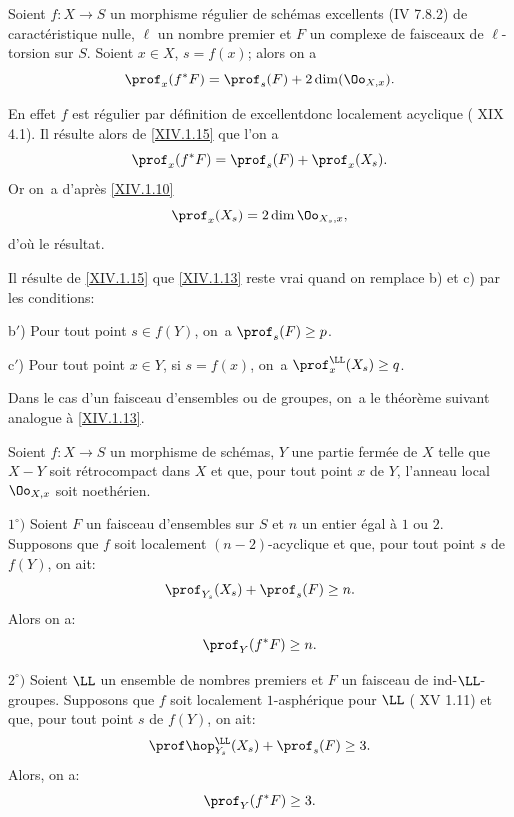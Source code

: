 \begin{corollaire} \label{XIV.1.16}
Soient $f:X\to S$ un morphisme r\'egulier de sch\'emas excellents (\textup{\EGA IV 7.8.2}) de caract\'eristique nulle, $\ell$ un nombre premier et $F$ un complexe de faisceaux de $\ell$-torsion sur $S$. Soient $x\in X$, $s=f(x)$; alors on a
$$
\prof_x(f^*F)=\prof_s(F)+2\dim(\Oo_{X, x}).
$$
\end{corollaire}

En effet $f$ est r\'egulier par d\'efinition de \og excellent\fg donc localement acyclique ( XIX 4.1). Il r\'esulte alors de \ref{XIV.1.15} que l'on a
$$
\prof_x(f^*F)=\prof_s(F)+\prof_x(X_s).
$$
Or on~a d'apr\`es \ref{XIV.1.10}
$$
\prof_x(X_s)=2\dim\Oo_{X_s, x},
$$
d'o\`u le r\'esultat.

\begin{remarque} \label{XIV.1.17}
Il r\'esulte de \ref{XIV.1.15} que \ref{XIV.1.13} reste vrai quand on remplace b) et c) par les conditions:

b$'$) Pour tout point $s\in f(Y)$, on~a $\prof_s(F)\geq p$.

c$'$) Pour tout point $x\in Y$, si $s=f(x)$, on~a $\prof^\LL_x(X_s)\geq q$.
\end{remarque}

Dans le cas d'un faisceau d'ensembles ou de groupes, on~a le th\'eor\`eme suivant analogue \`a \ref{XIV.1.13}.

\begin{theoreme} \label{XIV.1.18}
Soient $f:X\to S$ un morphisme de sch\'emas, $Y$ une partie ferm\'ee de $X$ telle que $X-Y$ soit r\'etrocompact dans $X$ et que, pour tout point $x$ de $Y$, l'anneau local $\Oo_{X, x}$ soit noeth\'erien.

$1^\circ)$ Soient $F$ un faisceau d'ensembles sur $S$ et $n$ un entier \'egal \`a $1$ ou $2$. Supposons que $f$ soit localement $(n-2)$-acyclique et que, pour tout point $s$ de $f(Y)$, on ait:
$$
\prof_{Y_s}(X_s)+\prof_s(F)\geq n.
$$
Alors on a:$$
\prof_Y(f^*F)\geq n.
$$

$2^\circ)$ Soient $\LL$ un ensemble de nombres premiers et $F$ un faisceau de ind-$\LL$-groupes. Supposons que $f$ soit localement $1$-asph\'erique pour $\LL$ (\textup{ XV 1.11}) et que, pour tout point $s$ de $f(Y)$, on ait:
$$
\prof\hop^\LL_{Y_s}(X_s)+\prof_s(F)\geq 3.
$$
Alors, on a:$$
\prof_Y(f^*F)\geq 3.
$$
\end{theoreme}


